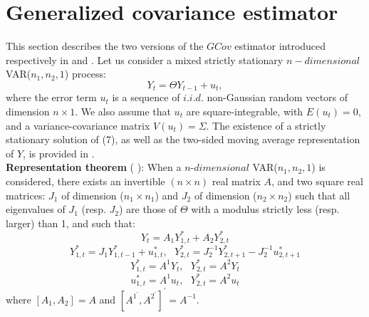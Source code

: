 \documentclass[<1p>]{elsarticle} %
\begin{document}
\section{Generalized covariance estimator}
This section describes the two versions of the $GCov$ estimator introduced respectively in \cite{gourieroux2017noncausal} and \cite{gourieroux2022generalized}. Let us consider a mixed strictly stationary $n-dimensional$ VAR($n_1,n_2,1$) process:
\begin{equation}
Y_{t}=\Theta Y_{t-1} + u_{t},
\end{equation}
where the error term $u_{t}$ is a sequence of $i.i.d.$ non-Gaussian random vectors of dimension $n \times 1$. We also assume that $u_t$ are square-integrable, with $E(u_t)=0$, and a variance-covariance matrix $V(u_t)=\Sigma$. The existence of a strictly stationary solution of (7), as well as the two-sided moving average representation of $Y$, is provided in \cite{gourieroux2017noncausal}.\\


\textbf{Representation theorem} (\textit{
\cite{gourieroux2017noncausal}}): When a $n$-$dimensional$ VAR($n_1, n_2, 1$) is considered, there exists an invertible $(n\times n)$ real matrix $A$, and two square real matrices: $J_{1}$ of dimension ($n_{1}\times n_{1}$) and $J_{2}$ of dimension ($n_{2}\times n_{2}$) such that all eigenvalues of $J_{1}$ (resp. $J_{2}$) are those of $\Theta$ with a modulus strictly less (resp. larger) than 1, and such that:
\begin{equation}
	Y_{t} =  A_{1}Y_{1,t}^{*}+ A_{2} Y_{2,t}^{*}
\end{equation}
\begin{equation}
	Y_{1,t}^{*} =  J_{1}Y_{1,t-1}^{*}+ u_{1,t}^{*}, \ \ \       Y_{2,t}^{*} =  J_{2}^{-1}Y_{2,t+1}^{*}-J_{2}^{-1} u_{2,t+1}^{*}
\end{equation}
\begin{equation}
	Y_{1,t}^{*} =  A^{1}Y_{t}, \ \ \ Y_{2,t}^{*} =  A^{2}Y_{t}
\end{equation}
 \begin{equation}
	u_{1,t}^{*} =  A^{1}u_{t}, \ \ \ Y_{2,t}^{*} =  A^{2}u_{t}
\end{equation}
where $[A_{1},A_{2}]=A$ and $[A^{1^{\prime}},A^{2^{\prime}}]^{\prime}=A^{-1}$.\\
\end{document}
